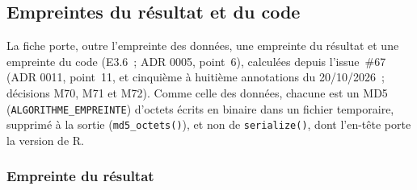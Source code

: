 \documentclass[a4paper,11pt]{article}
\newcommand{\code}[1]{\texttt{\small #1}}
\begin{document}
\subsection{Empreintes du résultat et du code}
\label{sec:empreinte-resultat}

La fiche porte, outre l'empreinte des données, une empreinte du résultat et
une empreinte du code (E3.6~; ADR 0005, point~6), calculées depuis
l'issue~\#67 (ADR 0011, point~11, et cinquième à huitième annotations du
20/10/2026~; décisions M70, M71 et M72). Comme celle des données, chacune
est un MD5 (\code{ALGORITHME\_EMPREINTE}) d'octets écrits en binaire dans un
fichier temporaire, supprimé à la sortie (\code{md5\_octets()}), et non de
\code{serialize()}, dont l'en-tête porte la version de R.

\subsubsection*{Empreinte du résultat}
\end{document}
